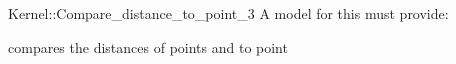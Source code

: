 \begin{ccRefFunctionObjectConcept}{Kernel::Compare_distance_to_point_3}
A model for this must provide:


{}

      {compares the distances of points  and  to point }

\end{ccRefFunctionObjectConcept}
